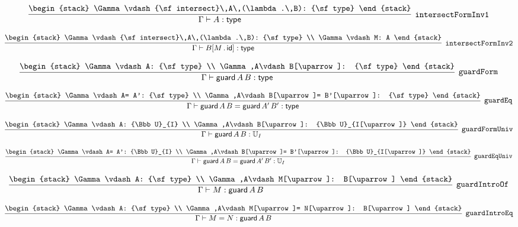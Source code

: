 \[
\infer[{\tt intersectFormInv1}]{\Gamma \vdash A: {\sf type}}{
\begin{stack}
\Gamma \vdash {\sf intersect}\,A\,(\lambda .\,B): {\sf type}
\end{stack}}
\]

\[
\infer[{\tt intersectFormInv2}]{\Gamma \vdash B[M\,.\,{\sf id}]: {\sf type}}{
\begin{stack}
\Gamma \vdash {\sf intersect}\,A\,(\lambda .\,B): {\sf type}
\\
\Gamma \vdash M: A
\end{stack}}
\]

\[
\infer[{\tt guardForm}]{\Gamma \vdash {\sf guard}\,A\,B: {\sf type}}{
\begin{stack}
\Gamma \vdash A: {\sf type}
\\
\Gamma ,A\vdash B[\uparrow ]: {\sf type}
\end{stack}}
\]

\[
\infer[{\tt guardEq}]{\Gamma \vdash {\sf guard}\,A\,B= {\sf guard}\,A'\,B': {\sf type}}{
\begin{stack}
\Gamma \vdash A= A': {\sf type}
\\
\Gamma ,A\vdash B[\uparrow ]= B'[\uparrow ]: {\sf type}
\end{stack}}
\]

\[
\infer[{\tt guardFormUniv}]{\Gamma \vdash {\sf guard}\,A\,B: {\Bbb U}_{I}}{
\begin{stack}
\Gamma \vdash A: {\Bbb U}_{I}
\\
\Gamma ,A\vdash B[\uparrow ]: {\Bbb U}_{I[\uparrow ]}
\end{stack}}
\]

\[
\infer[{\tt guardEqUniv}]{\Gamma \vdash {\sf guard}\,A\,B= {\sf guard}\,A'\,B': {\Bbb U}_{I}}{
\begin{stack}
\Gamma \vdash A= A': {\Bbb U}_{I}
\\
\Gamma ,A\vdash B[\uparrow ]= B'[\uparrow ]: {\Bbb U}_{I[\uparrow ]}
\end{stack}}
\]

\[
\infer[{\tt guardIntroOf}]{\Gamma \vdash M: {\sf guard}\,A\,B}{
\begin{stack}
\Gamma \vdash A: {\sf type}
\\
\Gamma ,A\vdash M[\uparrow ]: B[\uparrow ]
\end{stack}}
\]

\[
\infer[{\tt guardIntroEq}]{\Gamma \vdash M= N: {\sf guard}\,A\,B}{
\begin{stack}
\Gamma \vdash A: {\sf type}
\\
\Gamma ,A\vdash M[\uparrow ]= N[\uparrow ]: B[\uparrow ]
\end{stack}}
\]

